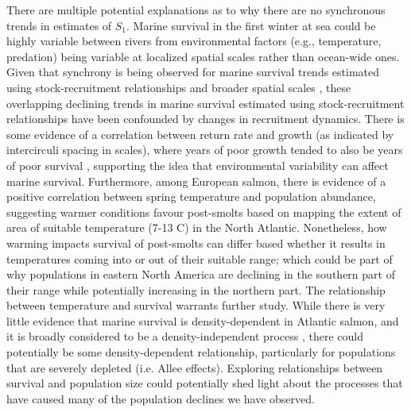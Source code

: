 \documentclass[12pt]{article}
\newcommand{\So}{$S_{1}$\xspace}
\begin{document}
There are multiple potential explanations as to why there are no synchronous
trends in estimates of \So. 
Marine survival in the first winter at sea could be highly variable between
rivers from environmental factors (e.g., temperature, predation) being
variable at localized spatial scales rather than ocean-wide ones.
Given that synchrony is being observed for marine survival trends estimated using
stock-recruitment relationships and broader spatial scales \citep{Olmos2019},
these overlapping declining trends in marine
survival estimated using stock-recruitment relationships have been confounded
by changes in recruitment dynamics.
There is some evidence of a correlation between return rate and growth (as
indicated by intercirculi spacing in scales), where years of poor growth
tended to also be years of poor survival \citep{Friedland1993}, supporting the
idea that environmental variability can affect marine survival.
Furthermore, among European salmon, there is evidence of a positive correlation
between spring temperature and population abundance, suggesting warmer
conditions favour post-smolts \citep{Friedland1998} based on mapping the
extent of area of suitable temperature (7-13 \textdegree C) in the North Atlantic.
Nonetheless, how warming impacts survival of post-smolts can differ based
whether it results in temperatures coming into or out of their suitable range;
which could be part of why populations in eastern North America are declining
in the southern part of their range while potentially increasing in the
northern part. The relationship between temperature and survival warrants 
further study.
While there is very little evidence that marine survival is density-dependent
in Atlantic salmon, and it is broadly considered to be a density-independent
process \citep{Jonsson1998,Gibson2006}, there could potentially be some
density-dependent relationship, particularly for populations that are severely
depleted (i.e. Allee effects). Exploring relationships between survival
and population size could potentially shed light about the processes that
have caused many of the population declines we have observed.
\end{document}
